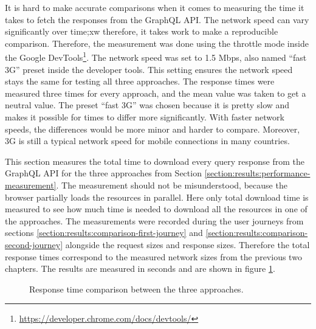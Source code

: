 It is hard to make accurate comparisons when it comes to measuring the time it takes to fetch the responses from the GraphQL \ac{API}. The network speed can vary significantly over time;xw therefore, it takes work to make a reproducible comparison. Therefore, the measurement was done using the throttle mode inside the Google DevTools\footnote{\url{https://developer.chrome.com/docs/devtools/}}. The network speed was set to 1.5 Mbps, also named \enquote{fast 3G} preset inside the developer tools. This setting ensures the network speed stays the same for testing all three approaches. The response times were measured three times for every approach, and the mean value was taken to get a neutral value. The preset \enquote{fast 3G} was chosen because it is pretty slow and makes it possible for times to differ more significantly. With faster network speeds, the differences would be more minor and harder to compare. Moreover, 3G is still a typical network speed for mobile connections in many countries.

\bigskip

\noindent This section measures the total time to download every query response from the GraphQL \ac{API} for the three approaches from Section \ref{section:results:performance-measurement}. The measurement should not be misunderstood, because the browser partially loads the resources in parallel. Here only total download time is measured to see how much time is needed to download all the resources in one of the approaches. The measurements were recorded during the user journeys from sections \ref{section:results:comparison-first-journey} and \ref{section:results:comparison-second-journey} alongside the request sizes and response sizes. Therefore the total response times correspond to the measured network sizes from the previous two chapters. The results are measured in seconds and are shown in figure \ref{fig:discussion:response-times}. 

\begin{figure}[H]
  \centering
  \caption{Response time comparison between the three approaches.}\label{fig:discussion:response-times}
\end{figure}

